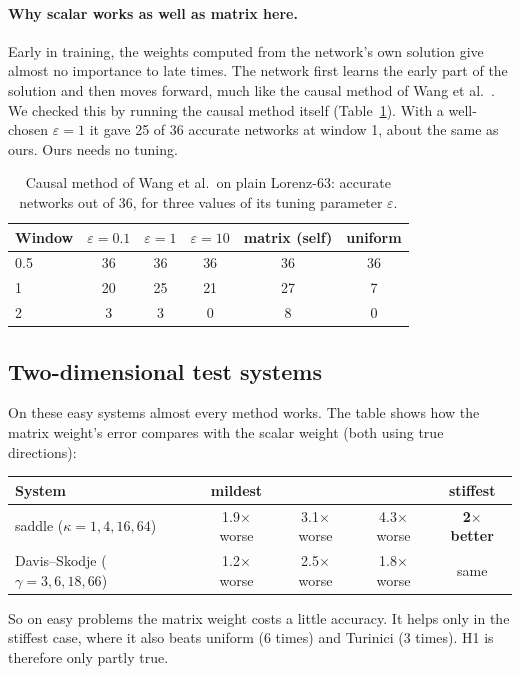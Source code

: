 \documentclass[11pt,a4paper]{article}
\begin{document}
\paragraph{Why scalar works as well as matrix here.} Early in training, the weights computed
from the network's own solution give almost no importance to late times. The network first
learns the early part of the solution and then moves forward, much like the causal method
of Wang et al.\ \cite{wang2022}. We checked this by running the causal method itself
(Table~\ref{tab:causal}). With a well-chosen $\varepsilon=1$ it gave 25 of 36 accurate
networks at window 1, about the same as ours. Ours needs no tuning.

\begin{table}[H]\centering
\caption{Causal method of Wang et al.\ on plain Lorenz-63: accurate networks out of 36,
for three values of its tuning parameter $\varepsilon$.}
\label{tab:causal}
\begin{tabular}{lccc|cc}\toprule
Window & $\varepsilon=0.1$ & $\varepsilon=1$ & $\varepsilon=10$ & matrix (self) & uniform\\\midrule
0.5 & 36 & 36 & 36 & 36 & 36\\
1 & 20 & 25 & 21 & 27 & 7\\
2 & 3 & 3 & 0 & 8 & 0\\\bottomrule
\end{tabular}
\end{table}

\subsection{Two-dimensional test systems}
On these easy systems almost every method works. The table shows how the matrix weight's
error compares with the scalar weight (both using true directions):
\begin{center}
\begin{tabular}{lcccc}\toprule
System & mildest & & & stiffest\\\midrule
saddle ($\kappa=1,4,16,64$) & 1.9$\times$ worse & 3.1$\times$ worse & 4.3$\times$ worse & \textbf{2$\times$ better}\\
Davis--Skodje ($\gamma=3,6,18,66$) & 1.2$\times$ worse & 2.5$\times$ worse & 1.8$\times$ worse & same\\\bottomrule
\end{tabular}
\end{center}
So on easy problems the matrix weight costs a little accuracy. It helps only in the
stiffest case, where it also beats uniform (6 times) and Turinici (3 times). H1 is
therefore only partly true.
\end{document}
